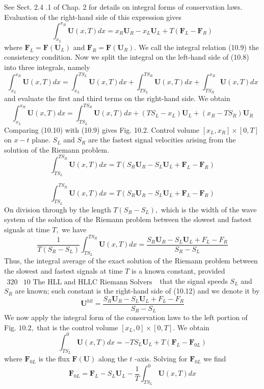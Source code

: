 See Sect. 2.4 .1 of Chap. 2 for details on integral forms of conservation laws. Evaluation of the right-hand side of this expression gives
$$
\int_{x_{L}}^{x_{R}} \mathbf{U}(x, T) d x=x_{R} \mathbf{U}_{R}-x_{L} \mathbf{U}_{L}+T\left(\mathbf{F}_{L}-\mathbf{F}_{R}\right)
$$
where $\mathbf{F}_{L}=\mathbf{F}\left(\mathbf{U}_{L}\right)$ and $\mathbf{F}_{R}=\mathbf{F}\left(\mathbf{U}_{R}\right) .$ We call the integral relation (10.9)
the consistency condition. Now we split the integral on the left-hand side of (10.8) into three integrals, namely
$$
\int_{x_{L}}^{x_{R}} \mathbf{U}(x, T) d x=\int_{x_{L}}^{T S_{L}} \mathbf{U}(x, T) d x+\int_{T S_{L}}^{T S_{R}} \mathbf{U}(x, T) d x+\int_{T S_{R}}^{x_{R}} \mathbf{U}(x, T) d x
$$
and evaluate the first and third terms on the right-hand side. We obtain
$$
\int_{x_{L}}^{x_{R}} \mathbf{U}(x, T) d x=\int_{T S_{L}}^{T S_{R}} \mathbf{U}(x, T) d x+\left(T S_{L}-x_{L}\right) \mathbf{U}_{L}+\left(x_{R}-T S_{R}\right) \mathbf{U}_{R}
$$
Comparing (10.10) with (10.9) gives
Fig. 10.2. Control volume $\left[x_{L}, x_{R}\right] \times[0, T]$ on $x-t$ plane. $S_{L}$ and $S_{R}$ are the fastest signal velocities arising from the solution of the Riemann problem.
$$
\int_{T S_{L}}^{T S_{R}} \mathbf{U}(x, T) d x=T\left(S_{R} \mathbf{U}_{R}-S_{L} \mathbf{U}_{L}+\mathbf{F}_{L}-\mathbf{F}_{R}\right)
$$

$$
\int_{T S_{L}}^{T S_{R}} \mathbf{U}(x, T) d x=T\left(S_{R} \mathbf{U}_{R}-S_{L} \mathbf{U}_{L}+\mathbf{F}_{L}-\mathbf{F}_{R}\right)
$$
On division through by the length $T\left(S_{R}-S_{L}\right),$ which is the width of the wave system of the solution of the Riemann problem between the slowest and fastest signals at time $T,$ we have
$$
\frac{1}{T\left(S_{R}-S_{L}\right)} \int_{T S_{L}}^{T S_{R}} \mathbf{U}(x, T) d x=\frac{S_{R} \mathbf{U}_{R}-S_{L} \mathbf{U}_{L}+F_{L}-F_{R}}{S_{R}-S_{L}}
$$
Thus, the integral average of the exact solution of the Riemann problem between the slowest and fastest signals at time $T$ is a known constant, provided
$\begin{array}{ll}320 & 10 \text { The HLL and HLLC Riemann Solvers }\end{array}$
that the signal speeds $S_{L}$ and $S_{R}$ are known; such constant is the right-hand side of (10.12) and we denote it by
$$
\mathbf{U}^{h l l}=\frac{S_{R} \mathbf{U}_{R}-S_{L} \mathbf{U}_{L}+F_{L}-F_{R}}{S_{R}-S_{L}}
$$
We now apply the integral form of the conservation laws to the left portion of Fig. $10.2,$ that is the control volume $\left[x_{L}, 0\right] \times[0, T] .$ We obtain
$$
\int_{T S_{L}}^{0} \mathbf{U}(x, T) d x=-T S_{L} \mathbf{U}_{L}+T\left(\mathbf{F}_{L}-\mathbf{F}_{0 L}\right)
$$
where $\mathbf{F}_{0 L}$ is the flux $\mathbf{F}(\mathbf{U})$ along the $t$ -axis. Solving for $\mathbf{F}_{0 L}$ we find
$$
\mathbf{F}_{0 L}=\mathbf{F}_{L}-S_{L} \mathbf{U}_{L}-\frac{1}{T} \int_{T S_{L}}^{0} \mathbf{U}(x, T) d x
$$

